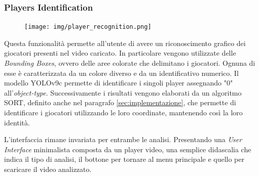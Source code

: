 \subsubsection{Players Identification}
\begin{figure}
    \centering
    \vspace{-0.5cm}
    \texttt{[image: img/player\_recognition.png]}
    \label{fig:player_identification}
\end{figure}

Questa funzionalità permette all'utente di avere un riconoscimento grafico dei giocatori presenti nel video caricato. In particolare vengono utilizzate delle \textit{Bounding Boxes}, ovvero delle aree colorate che delimitano i giocatori. Ognuna di esse è caratterizzata da un colore diverso e da un identificativo numerico. Il modello YOLOv9c permette di identificare i singoli player assegnando "0" all'\textit{object-type}. Successivamente i risultati vengono elaborati da un algoritmo SORT, definito anche nel paragrafo \ref{sec:implementazione}, che permette di identificare i giocatori utilizzando le loro coordinate, mantenendo così la loro identità.

\vspace{0.5cm}
\noindent L'interfaccia rimane invariata per entrambe le analisi. Presentando una \textit{User Interface} minimalista composta da un player video, una semplice didascalia che indica il tipo di analisi, il bottone per tornare al menu principale e quello per scaricare il video analizzato.
\clearpage







